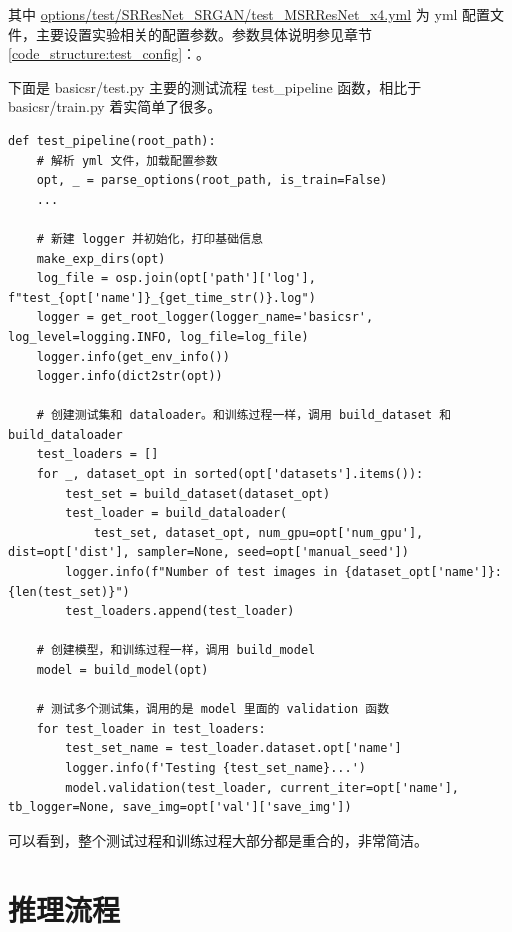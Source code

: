 \documentclass[../main.tex]{subfiles}
\begin{document}
其中 \href{https://github.com/XPixelGroup/BasicSR/blob/master/options/test/SRResNet\_SRGAN/test\_MSRResNet\_x4.yml}{options/test/SRResNet\_SRGAN/test\_MSRResNet\_x4.yml} 为 yml 配置文件，主要设置实验相关的配置参数。参数具体说明参见章节\ref{code_structure:test_config}：。

下面是 basicsr/test.py 主要的测试流程 test\_pipeline 函数，相比于 basicsr/train.py 着实简单了很多。

\begin{verbatim}
def test_pipeline(root_path):
    # 解析 yml 文件，加载配置参数
    opt, _ = parse_options(root_path, is_train=False)
    ...

    # 新建 logger 并初始化，打印基础信息
    make_exp_dirs(opt)
    log_file = osp.join(opt['path']['log'], f"test_{opt['name']}_{get_time_str()}.log")
    logger = get_root_logger(logger_name='basicsr', log_level=logging.INFO, log_file=log_file)
    logger.info(get_env_info())
    logger.info(dict2str(opt))

    # 创建测试集和 dataloader。和训练过程一样，调用 build_dataset 和 build_dataloader
    test_loaders = []
    for _, dataset_opt in sorted(opt['datasets'].items()):
        test_set = build_dataset(dataset_opt)
        test_loader = build_dataloader(
            test_set, dataset_opt, num_gpu=opt['num_gpu'], dist=opt['dist'], sampler=None, seed=opt['manual_seed'])
        logger.info(f"Number of test images in {dataset_opt['name']}: {len(test_set)}")
        test_loaders.append(test_loader)

    # 创建模型，和训练过程一样，调用 build_model
    model = build_model(opt)

    # 测试多个测试集，调用的是 model 里面的 validation 函数
    for test_loader in test_loaders:
        test_set_name = test_loader.dataset.opt['name']
        logger.info(f'Testing {test_set_name}...')
        model.validation(test_loader, current_iter=opt['name'], tb_logger=None, save_img=opt['val']['save_img'])
\end{verbatim}

可以看到，整个测试过程和训练过程大部分都是重合的，非常简洁。

\section{推理流程}\label{getting_start:inference_pipeline}
\end{document}
